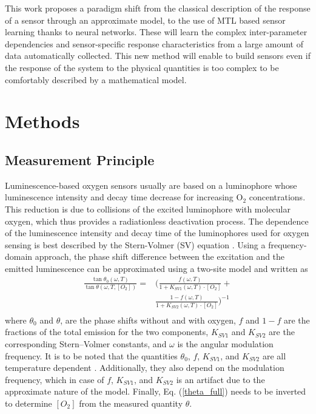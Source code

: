 \documentclass[sensors,article,submit,moreauthors,pdftex,10pt,a4paper]{Definitions/mdpi}
\begin{document}
This work proposes a paradigm shift from the classical description of the response of a sensor through an approximate model, to the use of MTL based sensor learning thanks to neural networks. 
These will learn the complex inter-parameter dependencies and sensor-specific response characteristics from a large amount of data automatically collected. This new method will enable to build sensors even if the response of the system to the physical quantities is too complex to be comfortably described by a mathematical model.


\section{Methods}
\label{sec:methods}

\subsection{Measurement Principle}
\label{Theory}

Luminescence-based oxygen sensors usually are based on a luminophore whose luminescence intensity and decay time decrease for increasing O$_2$ concentrations. This reduction is due to collisions of the excited luminophore with molecular oxygen, which thus provides a radiationless deactivation process. The dependence of the luminescence intensity and decay time of the luminophores used for oxygen sensing is best described by the Stern-Volmer (SV) equation \cite{Lakowicz2006}. Using a frequency-domain approach, the phase shift difference between the excitation and the emitted luminescence can be approximated using a two-site model \cite{Carraway1991,Demas1995} and written as \cite{Michelucci2019}
\begin{equation}
\begin{aligned}
\frac{\tan \theta_0 (\omega, T)}{\tan \theta (\omega, T, [O_2])}=
 & \bigg( \frac{f (\omega , T) }{1+K_{SV1} (\omega , T) \cdot \left[O_2\right]}+ \\
&\frac{1-f (\omega , T) }{1+K_{SV2} (\omega , T) \cdot \left[O_2\right]} \bigg)^{-1} \\
\label{theta_full}
\end{aligned}
\end{equation}
where $\theta_0$ and $\theta$, are the phase shifts without and with oxygen, $f$ and $1-f$ are the fractions of the total emission for the two components, $K_{SV1}$ and $K_{SV2}$ are the corresponding Stern–Volmer constants, and $\omega$ is the angular modulation frequency. It is to be noted that the quantities $\theta_0$, $f$, $K_{SV1}$, and $K_{SV2}$ are all temperature dependent \cite{Ogurtsov2006,lo2008,Zaitsev2016}. Additionally, they also depend on the modulation frequency, which in case of $f$, $K_{SV1}$, and $K_{SV2}$ is an artifact due to the approximate nature of the model. Finally, Eq. (\ref{theta_full}) needs to be inverted to determine $[O_2]$ from the measured quantity $\theta$.
\end{document}
